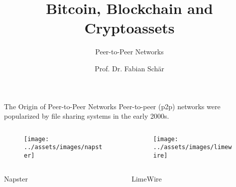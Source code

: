 \documentclass[]{beamer}
\title{Bitcoin, Blockchain and Cryptoassets}
\subtitle{Peer-to-Peer Networks}
\author{Prof. Dr. Fabian Schär}
\institute{University of Basel}
\begin{document}
\thispagestyle{empty}
\begin{frame}[noframenumbering]
	\titlepage
\end{frame}

\begin{frame}{The Origin of Peer-to-Peer Networks}
	Peer-to-peer (p2p) networks were popularized by file sharing systems in the early 2000s.
	\begin{columns}
		\begin{column}{0.5\textwidth}
			\begin{figure}
				\begin{center}
					\texttt{[image: ../assets/images/napster]}
				\end{center}
			\end{figure}
		\end{column}
		\begin{column}{0.5\textwidth}
			\begin{figure}
				\begin{center}
					\texttt{[image: ../assets/images/limewire]}
				\end{center}
			\end{figure}
		\end{column}
	\end{columns}
	\begin{columns}
		\begin{column}{0.5\textwidth}
			\begin{center}
				Napster
			\end{center}
		\end{column}
		\begin{column}{0.5\textwidth}
			\begin{center}
				LimeWire
			\end{center}
		\end{column}
	\end{columns}
	\vspace{1.8em}
\end{frame}
\end{document}
